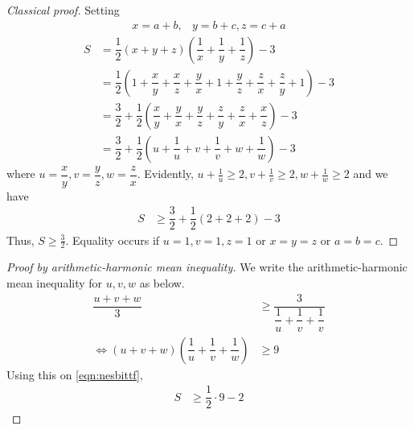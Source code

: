 \documentclass{subfile}
\begin{document}
		\begin{proof}[\itshape Classical proof]
			Setting
				\begin{align}
					x=a+b,
						& y=b+c,z=c+a\label{eqn:nesbittsub}
				\end{align}
				\begin{align*}
					S
						& = \dfrac{1}{2}(x+y+z)\left(\dfrac{1}{x}+\dfrac{1}{y}+\dfrac{1}{z}\right)-3\\
						& = \dfrac{1}{2}\left(1+\dfrac{x}{y}+\dfrac{x}{z}+\dfrac{y}{x}+1+\dfrac{y}{z}+\dfrac{z}{x}+\dfrac{z}{y}+1\right)-3\\
						& = \dfrac{3}{2}+\dfrac{1}{2}\left(\dfrac{x}{y}+\dfrac{y}{x}+\dfrac{y}{z}+\dfrac{z}{y}+\dfrac{z}{x}+\dfrac{x}{z}\right)-3\\
						& = \dfrac{3}{2}+\dfrac{1}{2}\left(u+\dfrac{1}{u}+v+\dfrac{1}{v}+w+\dfrac{1}{w}\right)-3
				\end{align*}
			where $u=\dfrac{x}{y},v=\dfrac{y}{z},w=\dfrac{z}{x}$. Evidently, $u+\frac{1}{u}\geq2,v+\frac{1}{v}\geq2,w+\frac{1}{w}\geq2$ and we have
				\begin{align*}
					S
						& \geq\dfrac{3}{2}+\dfrac{1}{2}(2+2+2)-3
				\end{align*}
			Thus, $S\geq\frac{3}{2}$. Equality occurs if $u=1,v=1,z=1$ or $x=y=z$ or $a=b=c$.
		\end{proof}

		\begin{proof}[\itshape Proof by arithmetic-harmonic mean inequality]
			We write the arithmetic-harmonic mean inequality for $u,v,w$ as below.
				\begin{align*}
					\dfrac{u+v+w}{3}
						& \geq\dfrac{3}{\dfrac{1}{u}+\dfrac{1}{v}+\dfrac{1}{v}}\\
					\iff(u+v+w)\left(\dfrac{1}{u}+\dfrac{1}{v}+\dfrac{1}{w}\right)
						& \geq9
				\end{align*}
			Using this on \ref{eqn:nesbittf},
				\begin{align*}
					S
						& \geq\dfrac{1}{2}\cdot9-2
				\end{align*}
		\end{proof}
\end{document}
